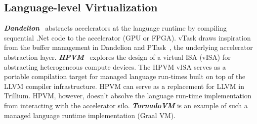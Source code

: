 \subsection{Language-level Virtualization}
\textbf{\textit{Dandelion}}~\cite{dandelion} abstracts accelerators at the
language runtime by compiling sequential .Net code to the accelerator
(GPU or FPGA). vTask draws inspiration from the buffer management in Dandelion
and PTask~\cite{rossbach2011ptask}, the underlying accelerator abstraction
layer.
\textbf{\textit{HPVM}}~\cite{HPVM} explores the design of a virtual ISA
(vISA) for abstracting heterogeneous compute devices. The HPVM vISA serves as
a portable compilation target for managed language run-times built on top of
the LLVM compiler infrastructure. HPVM can serve as a replacement for LLVM in
Trillium. HPVM, however, doesn't absolve the language run-time implementation
from interacting with the accelerator silo. \textbf{\textit{TornadoVM}} is an
example of such a managed language runtime implementation (Graal VM).